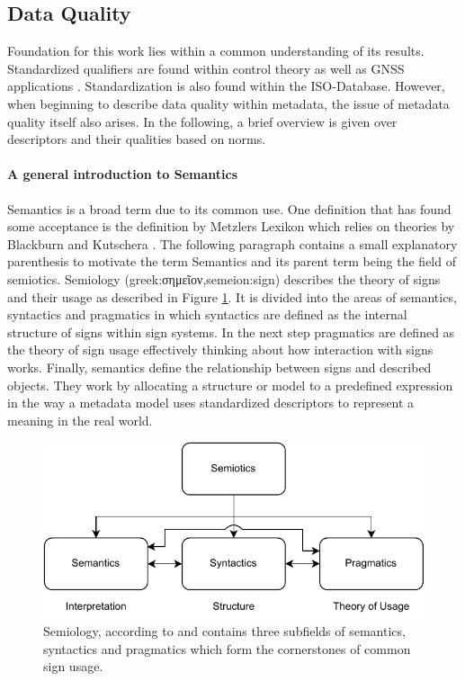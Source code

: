 \subsection{Data Quality}
Foundation for this work lies within a common understanding of its results. Standardized qualifiers are found within control theory \cite{isermann_fault-diagnosis_2011} as well as GNSS applications \cite{teunissen_springer_2017}. Standardization is also found within the ISO-Database. However, when beginning to describe data quality within metadata, the issue of metadata quality itself also arises. In the following, a brief overview is given over descriptors and their qualities based on norms.

\paragraph{A general introduction to Semantics}
Semantics is a broad term due to its common use. One definition that has found some acceptance is the definition by Metzlers Lexikon which relies on theories by Blackburn and Kutschera \cite{shoemaker_spreading_1987,kutschera_sprachphilosophie_1975}. The following paragraph contains a small explanatory parenthesis to motivate the term Semantics and its parent term being the field of semiotics. Semiology (greek:\textgreek{σημεῖον},semeion:sign) describes the theory of signs and their usage as described in Figure \ref{fig:semiotics}. It is divided into the areas of semantics, syntactics and pragmatics in which syntactics are defined as the internal structure of signs within sign systems. In the next step pragmatics are defined as the theory of sign usage effectively thinking about how interaction with signs works. Finally, semantics define the relationship between signs and described objects. They work by allocating a structure or model to a predefined expression in the way a metadata model uses standardized descriptors to represent a meaning in the real world.

\begin{figure}[h]
    \centering
    \includegraphics[width=.7\textwidth]{03_figures/semiotics.pdf}
    \caption[A semiology overview]{Semiology, according to \textcite{kutschera_sprachphilosophie_1975} and \textcite{shoemaker_spreading_1987} contains three subfields of semantics, syntactics and pragmatics which form the cornerstones of common sign usage.}
    \label{fig:semiotics}
\end{figure}

